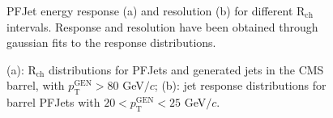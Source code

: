 \documentclass{cmspaper}
\begin{document}
\begin{figure}[tb]
\centering
{}
\caption{PFJet energy response (a) and resolution (b) for different R$_{\mathrm{ch}}$ intervals. Response and resolution have been obtained through gaussian fits to the response distributions.\label{fig:Rch_binning_FIT}}
\end{figure}


\begin{figure}[tb]
\centering
{}
\caption{(a): R$_{\mathrm{ch}}$ distributions for PFJets and generated jets in the CMS barrel, with $p_{\mathrm{T}}^{\mathrm{GEN}}>80$ GeV$/c$; (b): jet response distributions for barrel PFJets with $20 < p_{\mathrm{T}}^{\mathrm{GEN}} < 25$ GeV$/c$. \label{fig:Rch_distrib}}
\end{figure}
\clearpage
\end{document}
